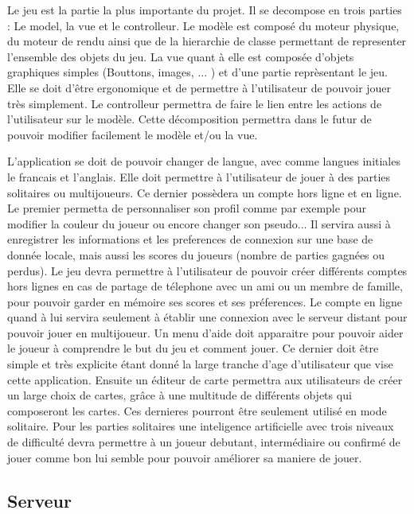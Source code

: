 \documentclass[a4paper,11pt]{report}
\begin{document}
		Le jeu est la partie la plus importante du projet. 
		Il se decompose en trois parties : Le model, la vue et le controlleur. 
		Le modèle est composé du moteur physique, du moteur de rendu ainsi que de la
		hierarchie de classe permettant de representer l'ensemble des objets du jeu. 
		La vue quant à elle est composée d'objets graphiques simples (Bouttons, images, ... ) 
		et d'une partie reprèsentant le jeu. Elle se doit d'être ergonomique et de permettre
		à l'utilisateur de pouvoir jouer très simplement. Le controlleur permettra de faire 
		le lien entre les actions de l'utilisateur sur le modèle. Cette décomposition permettra dans 
		le futur de pouvoir modifier facilement le modèle et/ou la vue.
		
		L'application se doit de pouvoir changer de langue, avec comme langues initiales le francais et l'anglais.
		Elle doit permettre à l'utilisateur de jouer à des parties solitaires ou multijoueurs. 
		Ce dernier possèdera un compte hors ligne et en ligne.		
		Le premier permetta de personnaliser son profil comme par exemple pour modifier
		la couleur du joueur ou encore changer son pseudo... Il servira aussi à enregistrer les informations
		et les preferences de connexion sur une base de donnée locale,
		mais aussi les scores du joueurs (nombre de parties gagnées ou perdus). 
		Le jeu devra permettre à l'utilisateur de pouvoir créer différents comptes hors lignes en cas de partage de télephone
		avec un ami ou un membre de famille, pour pouvoir garder en mémoire ses scores et ses préferences.		
		Le compte en ligne quand à lui servira seulement à établir une connexion avec le serveur distant pour pouvoir jouer en multijoueur.		
		Un menu d'aide doit apparaitre pour pouvoir aider le joueur à comprendre le but du jeu et comment jouer. 
		Ce dernier doit être simple et très explicite étant donné la large tranche d'age d'utilisateur que vise cette application.		
		Ensuite un éditeur de carte permettra aux utilisateurs de créer un large choix de cartes, 
		grâce à une multitude de différents objets qui composeront les cartes. Ces dernieres pourront être seulement utilisé en mode solitaire.
		Pour les parties solitaires une inteligence artificielle avec trois niveaux de difficulté 
		devra permettre à un joueur debutant, intermédiaire ou confirmé de jouer comme bon lui semble pour pouvoir améliorer sa maniere de jouer.
		
		\subsection{Serveur}
		
\end{document}
